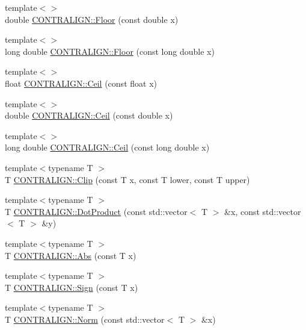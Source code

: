 \begin{DoxyCompactItemize}
\item 
{\footnotesize template$<$$>$ }\\double \hyperlink{namespace_c_o_n_t_r_a_l_i_g_n_aad3a78d6112cc443813287d60afa95a2}{C\+O\+N\+T\+R\+A\+L\+I\+G\+N\+::\+Floor} (const double x)
\item 
{\footnotesize template$<$$>$ }\\long double \hyperlink{namespace_c_o_n_t_r_a_l_i_g_n_a80f1355ab7b7bb9ad01c2a1ac800833f}{C\+O\+N\+T\+R\+A\+L\+I\+G\+N\+::\+Floor} (const long double x)
\item 
{\footnotesize template$<$$>$ }\\float \hyperlink{namespace_c_o_n_t_r_a_l_i_g_n_afd0532ccadde7e7c48ee5bcc64693122}{C\+O\+N\+T\+R\+A\+L\+I\+G\+N\+::\+Ceil} (const float x)
\item 
{\footnotesize template$<$$>$ }\\double \hyperlink{namespace_c_o_n_t_r_a_l_i_g_n_ac39c37f6c9451024a010d4821c1c1607}{C\+O\+N\+T\+R\+A\+L\+I\+G\+N\+::\+Ceil} (const double x)
\item 
{\footnotesize template$<$$>$ }\\long double \hyperlink{namespace_c_o_n_t_r_a_l_i_g_n_aa275ad45d22c758e8f3a98f0804f91ea}{C\+O\+N\+T\+R\+A\+L\+I\+G\+N\+::\+Ceil} (const long double x)
\item 
{\footnotesize template$<$typename T $>$ }\\T \hyperlink{namespace_c_o_n_t_r_a_l_i_g_n_a469955594da581dc70e2bafc9f235680}{C\+O\+N\+T\+R\+A\+L\+I\+G\+N\+::\+Clip} (const T x, const T lower, const T upper)
\item 
{\footnotesize template$<$typename T $>$ }\\T \hyperlink{namespace_c_o_n_t_r_a_l_i_g_n_a060f37f304d3b409ad044d105b37c4af}{C\+O\+N\+T\+R\+A\+L\+I\+G\+N\+::\+Dot\+Product} (const std\+::vector$<$ T $>$ \&x, const std\+::vector$<$ T $>$ \&y)
\item 
{\footnotesize template$<$typename T $>$ }\\T \hyperlink{namespace_c_o_n_t_r_a_l_i_g_n_ac6566074a120c798141a91753c50290f}{C\+O\+N\+T\+R\+A\+L\+I\+G\+N\+::\+Abs} (const T x)
\item 
{\footnotesize template$<$typename T $>$ }\\T \hyperlink{namespace_c_o_n_t_r_a_l_i_g_n_aa4f87aa569c6cb44a0e15a73cc475c13}{C\+O\+N\+T\+R\+A\+L\+I\+G\+N\+::\+Sign} (const T x)
\item 
{\footnotesize template$<$typename T $>$ }\\T \hyperlink{namespace_c_o_n_t_r_a_l_i_g_n_aea939de28045df5b9199ff4bf6a93b49}{C\+O\+N\+T\+R\+A\+L\+I\+G\+N\+::\+Norm} (const std\+::vector$<$ T $>$ \&x)

\end{DoxyCompactItemize}
